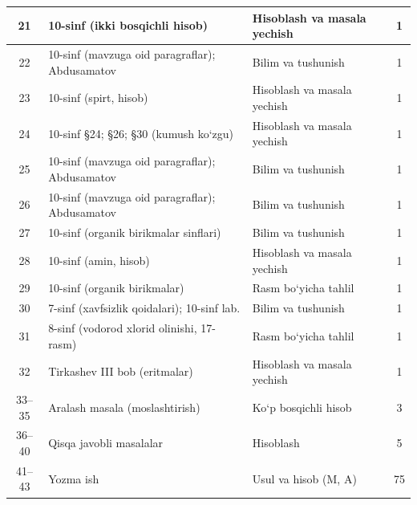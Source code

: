 \documentclass[11pt,a4paper]{article}
\begin{document}
{\begin{longtable}{|c|p{7.2cm}|p{5.4cm}|c|}
21 & 10-sinf (ikki bosqichli hisob) & Hisoblash va masala yechish & 1\\\hline
22 & 10-sinf (mavzuga oid paragraflar); Abdusamatov & Bilim va tushunish & 1\\\hline
23 & 10-sinf (spirt, hisob) & Hisoblash va masala yechish & 1\\\hline
24 & 10-sinf \S{}24; \S{}26; \S{}30 (kumush ko`zgu) & Hisoblash va masala yechish & 1\\\hline
25 & 10-sinf (mavzuga oid paragraflar); Abdusamatov & Bilim va tushunish & 1\\\hline
26 & 10-sinf (mavzuga oid paragraflar); Abdusamatov & Bilim va tushunish & 1\\\hline
27 & 10-sinf (organik birikmalar sinflari) & Bilim va tushunish & 1\\\hline
28 & 10-sinf (amin, hisob) & Hisoblash va masala yechish & 1\\\hline
29 & 10-sinf (organik birikmalar) & Rasm bo`yicha tahlil & 1\\\hline
30 & 7-sinf (xavfsizlik qoidalari); 10-sinf lab. & Bilim va tushunish & 1\\\hline
31 & 8-sinf (vodorod xlorid olinishi, 17-rasm) & Rasm bo`yicha tahlil & 1\\\hline
32 & Tirkashev III bob (eritmalar) & Hisoblash va masala yechish & 1\\\hline
33--35 & Aralash masala (moslashtirish) & Ko`p bosqichli hisob & 3\\\hline
36--40 & Qisqa javobli masalalar & Hisoblash & 5\\\hline
41--43 & Yozma ish & Usul va hisob (M, A) & 75\\\hline
\end{longtable}}
\end{document}
